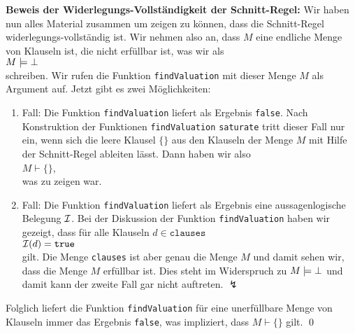 \noindent
\textbf{Beweis der Widerlegungs-Vollst\"{a}ndigkeit der Schnitt-Regel:}
Wir haben nun alles Material zusammen um zeigen zu k\"{o}nnen, dass die Schnitt-Regel
widerlegungs-vollst\"{a}ndig ist.  Wir nehmen also an, dass $M$ eine endliche Menge von Klauseln ist,  die nicht
erf\"{u}llbar ist, was wir als
\\[0.2cm]
\hspace*{1.3cm}
$M \models \bot$ 
\\[0.2cm]
schreiben.  Wir rufen die Funktion \texttt{findValuation} mit dieser Menge $M$ als Argument auf.
Jetzt gibt es zwei M\"{o}glichkeiten:
\begin{enumerate}
\item Fall: Die Funktion \texttt{findValuation} liefert als Ergebnis \texttt{false}.  Nach
      Konstruktion der Funktionen \texttt{findValuation} \texttt{saturate} tritt dieser Fall nur
      ein, wenn sich die leere Klausel $\{\}$ aus den Klauseln der Menge $M$ mit Hilfe der
      Schnitt-Regel ableiten l\"{a}sst.  Dann haben wir also
      \\[0.2cm]
      \hspace*{1.3cm}
      $M \vdash \{\}$,
      \\[0.2cm]
      was zu zeigen war.
\item Fall: Die Funktion \texttt{findValuation} liefert als Ergebnis eine aussagenlogische Belegung
      $\mathcal{I}$.  Bei der Diskussion der Funktion \texttt{findValuation} haben wir gezeigt, dass f\"{u}r
      alle Klauseln $d \in \mathtt{clauses}$
      \\[0.2cm]
      \hspace*{1.3cm}
      $\mathcal{I}(d) = \mathtt{true}$
      \\[0.2cm]
      gilt.  Die Menge \texttt{clauses} ist aber genau die Menge $M$ und damit sehen wir, dass die
      Menge $M$ erf\"{u}llbar ist.  Dies steht im Widerspruch zu $M \models \bot$ und damit kann der
      zweite Fall gar nicht auftreten. $\lightning$
\end{enumerate}
Folglich liefert die Funktion \texttt{findValuation} f\"{u}r eine unerf\"{u}llbare Menge von Klauseln immer
das Ergebnis \texttt{false}, was impliziert, dass $M \vdash \{\}$ gilt.  \qed

